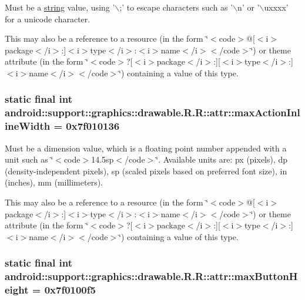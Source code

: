 Must be a \hyperlink{classandroid_1_1support_1_1graphics_1_1drawable_1_1_r_1_1string}{string} value, using '$\backslash$;' to escape characters such as '$\backslash$n' or '$\backslash$uxxxx' for a unicode character. 

This may also be a reference to a resource (in the form \char`\"{}$<$code$>$@\mbox{[}$<$i$>$package$<$/i$>$:\mbox{]}$<$i$>$type$<$/i$>$:$<$i$>$name$<$/i$>$$<$/code$>$\char`\"{}) or theme attribute (in the form \char`\"{}$<$code$>$?\mbox{[}$<$i$>$package$<$/i$>$:\mbox{]}\mbox{[}$<$i$>$type$<$/i$>$:\mbox{]}$<$i$>$name$<$/i$>$$<$/code$>$\char`\"{}) containing a value of this type. \hypertarget{classandroid_1_1support_1_1graphics_1_1drawable_1_1_r_1_1attr_0ad34eaec031cc38dc586160f6fac609}{
\subsubsection[{maxActionInlineWidth}]{\setlength{\rightskip}{0pt plus 5cm}static final int android::support::graphics::drawable.R.R::attr::maxActionInlineWidth = 0x7f010136}}
\label{classandroid_1_1support_1_1graphics_1_1drawable_1_1_r_1_1attr_0ad34eaec031cc38dc586160f6fac609}


Must be a dimension value, which is a floating point number appended with a unit such as \char`\"{}$<$code$>$14.5sp$<$/code$>$\char`\"{}. Available units are: px (pixels), dp (density-independent pixels), sp (scaled pixels based on preferred font size), in (inches), mm (millimeters). 

This may also be a reference to a resource (in the form \char`\"{}$<$code$>$@\mbox{[}$<$i$>$package$<$/i$>$:\mbox{]}$<$i$>$type$<$/i$>$:$<$i$>$name$<$/i$>$$<$/code$>$\char`\"{}) or theme attribute (in the form \char`\"{}$<$code$>$?\mbox{[}$<$i$>$package$<$/i$>$:\mbox{]}\mbox{[}$<$i$>$type$<$/i$>$:\mbox{]}$<$i$>$name$<$/i$>$$<$/code$>$\char`\"{}) containing a value of this type. \hypertarget{classandroid_1_1support_1_1graphics_1_1drawable_1_1_r_1_1attr_14feab4d9177e4a9631e5848953cab0c}{
\subsubsection[{maxButtonHeight}]{\setlength{\rightskip}{0pt plus 5cm}static final int android::support::graphics::drawable.R.R::attr::maxButtonHeight = 0x7f0100f5}}
\label{classandroid_1_1support_1_1graphics_1_1drawable_1_1_r_1_1attr_14feab4d9177e4a9631e5848953cab0c}


